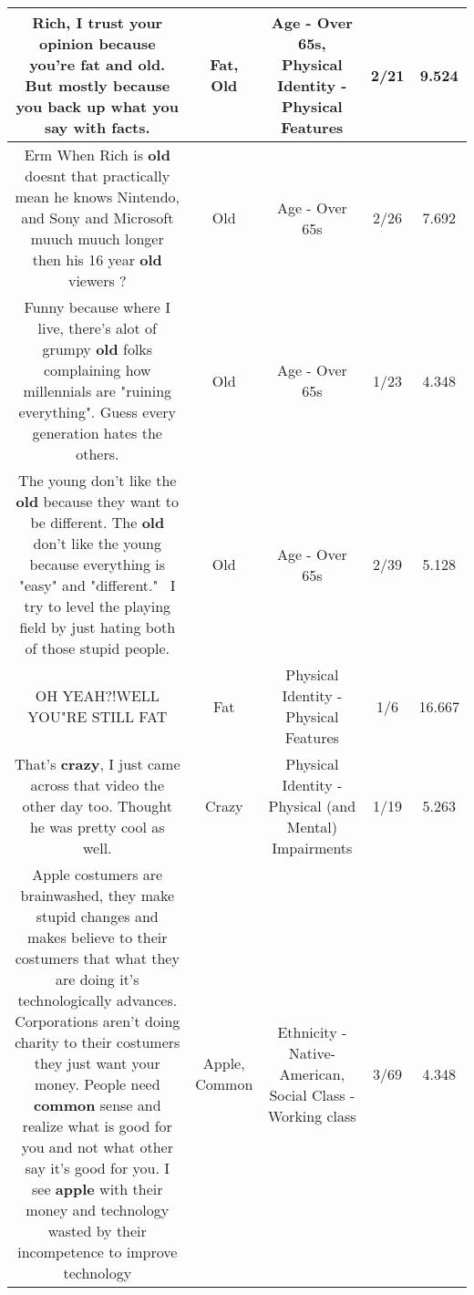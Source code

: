 \documentclass[11pt]{article}
\newlength\mylength
\begin{document}
\begin{center}
\begin{longtable}{|C{.65\mylength}|C{.30\mylength}|C{.12\mylength}|C{.12\mylength}|C{.12\mylength}|}
  \small Rich, I trust your opinion because you're \textbf{fat} and \textbf{old}. But mostly because you back up what you say with facts.\normalsize   & Fat, Old & Age - Over 65s, Physical Identity - Physical Features & 2/21 & 9.524 \\  \hline
  \small Erm When Rich is \textbf{old} doesnt that practically mean he knows Nintendo, and  Sony and Microsoft muuch muuch longer then his 16 year \textbf{old} viewers ?\normalsize   & Old & Age - Over 65s & 2/26 & 7.692 \\  \hline
  \small Funny because where I live, there's alot of grumpy \textbf{old} folks complaining how millennials are "ruining everything". Guess every generation hates the others.\normalsize   & Old & Age - Over 65s & 1/23 & 4.348 \\  \hline
  \small The young don't like the \textbf{old} because they want to be different. The \textbf{old} don't like the young because everything is "easy" and "different."  I try to level the playing field by just hating both of those stupid people.\normalsize   & Old & Age - Over 65s & 2/39 & 5.128 \\  \hline
  \small OH YEAH?!WELL YOU"RE STILL  FAT\normalsize   & Fat & Physical Identity - Physical Features & 1/6 & 16.667 \\  \hline
  \small That's \textbf{crazy}, I just came across that video the other day too. Thought he was pretty cool as well.\normalsize   & Crazy & Physical Identity - Physical (and Mental) Impairments & 1/19 & 5.263 \\  \hline
  \small Apple costumers are brainwashed, they make stupid changes and makes believe to their costumers that what they are doing it's technologically advances. Corporations aren't doing charity to their costumers they just want your money. People need \textbf{common} sense and realize what is good for you and not what other say it's good for you. I see \textbf{apple} with their money and technology wasted by their incompetence to improve technology\normalsize   & Apple, Common & Ethnicity - Native-American, Social Class - Working class & 3/69 & 4.348 \\  \hline

\end{longtable}
\end{center}
\end{document}
